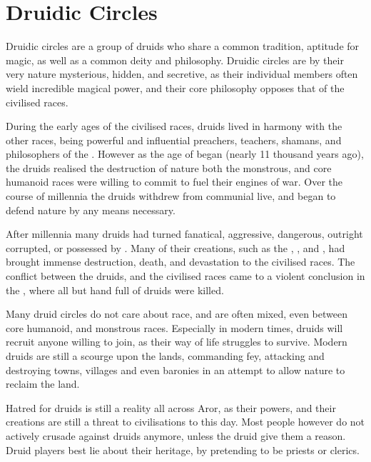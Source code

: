 \section{Druidic Circles}
\label{sec:Druidic Circle}

Druidic circles are a group of druids who share a common tradition, aptitude
for magic, as well as a common deity and philosophy. Druidic circles are by
their very nature mysterious, hidden, and secretive, as their individual
members often wield incredible magical power, and their core philosophy
opposes that of the civilised races.

During the early ages of the civilised races, druids lived in harmony with
the other races, being powerful and influential preachers, teachers, shamans,
and philosophers of the . However as the age of
 began (nearly 11 thousand years ago), the druids realised
the destruction of nature both the monstrous, and core humanoid races were
willing to commit to fuel their engines of war. Over the course of millennia
the druids withdrew from communial live, and began to defend nature by any
means necessary.

After millennia many druids had turned fanatical, aggressive, dangerous,
outright corrupted, or possessed by . Many of their
creations, such as the , , and
, had brought immense destruction, death, and
devastation to the civilised races. The conflict between the druids, and
the civilised races came to a violent conclusion in the , where all but hand full of druids were killed.

Many druid circles do not care about race, and are often mixed, even between
core humanoid, and monstrous races. Especially in modern times, druids will
recruit anyone willing to join, as their way of life struggles to survive.
Modern druids are still a scourge upon the lands, commanding fey, attacking
and destroying towns, villages and even baronies in an attempt to allow
nature to reclaim the land.

\begin{note}
  Hatred for druids is still a reality all across Aror, as their powers, and
  their creations are still a threat to civilisations to this day. Most
  people however do not actively crusade against druids anymore, unless the
  druid give them a reason. Druid players best lie about their heritage,
  by pretending to be priests or clerics.
\end{note}

